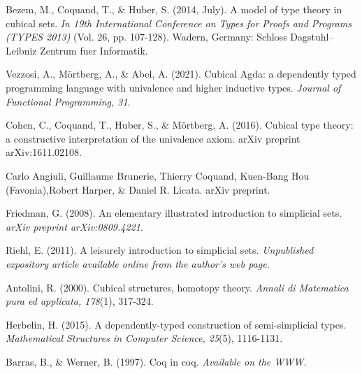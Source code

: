 \documentclass[10pt]{amsart}
\theoremstyle{definition}
\numberwithin{definition}{subsection}
\numberwithin{definition}{section}
\begin{document}
\begin{thebibliography}{10}
  Bezem, M., Coquand, T., \& Huber, S. (2014, July). A model of type theory in cubical sets. \textit{In 19th International Conference on Types for Proofs and Programs (TYPES 2013)} (Vol. 26, pp. 107-128). Wadern, Germany: Schloss Dagstuhl–Leibniz Zentrum fuer Informatik.

  Vezzosi, A., Mörtberg, A., \& Abel, A. (2021). Cubical Agda: a dependently typed programming language with univalence and higher inductive types. \textit{Journal of Functional Programming, 31}.

  Cohen, C., Coquand, T., Huber, S., \& Mörtberg, A. (2016). Cubical type theory: a constructive interpretation of the univalence axiom. arXiv preprint arXiv:1611.02108.

  Carlo Angiuli, Guillaume Brunerie, Thierry Coquand, Kuen-Bang Hou (Favonia),Robert Harper, \& Daniel R. Licata. arXiv preprint.

  Friedman, G. (2008). An elementary illustrated introduction to simplicial sets. \textit{arXiv preprint arXiv:0809.4221}.

  Riehl, E. (2011). A leisurely introduction to simplicial sets. \textit{Unpublished expository article available online from the author's web page}.

  Antolini, R. (2000). Cubical structures, homotopy theory. \textit{Annali di Matematica pura ed applicata, 178}(1), 317-324.

  Herbelin, H. (2015). A dependently-typed construction of semi-simplicial types. \textit{Mathematical Structures in Computer Science, 25}(5), 1116-1131.

  Barras, B., \& Werner, B. (1997). Coq in coq. \textit{Available on the WWW.}
\end{thebibliography}
\end{document}
